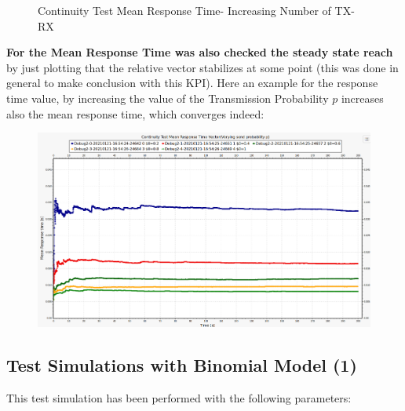 \begin{itemize}
\begin{figure}[H]
		\caption{Continuity Test Mean Response Time- Increasing Number of TX-RX}
		\label {img: continuityTestTXRXResponse}
	\end{figure}
\end{itemize} 
\textbf{For the Mean Response Time was also checked the steady state reach} by just plotting that the relative vector stabilizes at some point (this was done in general to make conclusion with this KPI). Here an example for the response time value, by increasing the value of the Transmission Probability $p$ increases also the mean response time, which converges indeed:
\begin{figure}[H]
	\centering
	\includegraphics[width=\textwidth]{img/ContinuityTest_ResponseTime_VectorP.png}
	\label {img: responseTimeConvergence}
\end{figure}
\subsection{Test Simulations with Binomial Model (1)}
This test simulation has been performed with the following parameters:
